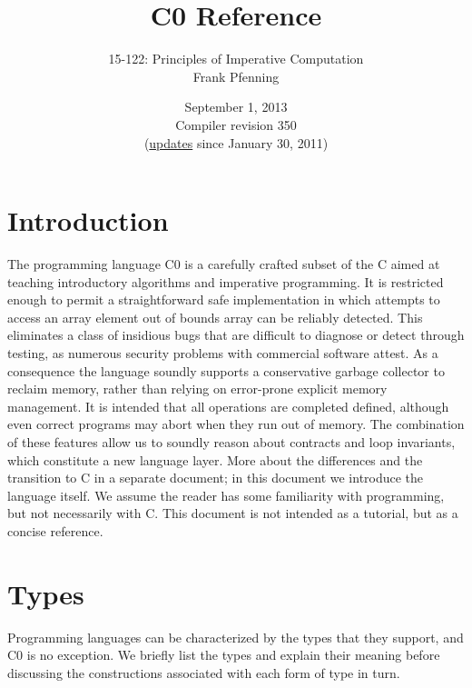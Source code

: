 \documentclass[11pt]{article}
\title{C0 Reference}
\author{15-122: Principles of Imperative Computation \\ Frank Pfenning}
\date{September 1, 2013\\Compiler revision 350\\
  (\hyperlink{sec:updates}{updates} since January 30, 2011)}
\begin{document}
\maketitle

\section{Introduction}

The programming language C0 is a carefully crafted subset of the C
aimed at teaching introductory algorithms and imperative programming.
It is restricted enough to permit a straightforward safe
implementation in which attempts to access an array element out of
bounds array can be reliably detected.  This eliminates a class of
insidious bugs that are difficult to diagnose or detect through
testing, as numerous security problems with commercial software
attest.  As a consequence the language soundly supports a conservative
garbage collector to reclaim memory, rather than relying on
error-prone explicit memory management.  It is intended that all
operations are completed defined, although even correct programs may
abort when they run out of memory.  The combination of these features
allow us to soundly reason about contracts and loop invariants, which
constitute a new language layer.  More about the differences and the
transition to C in a separate document; in this document we introduce
the language itself.  We assume the reader has some familiarity with
programming, but not necessarily with C\@.  This document is not intended
as a tutorial, but as a concise reference.

\section{Types}

Programming languages can be characterized by the types that they support,
and C0 is no exception.  We briefly list the types and explain their
meaning before discussing the constructions associated with each
form of type in turn.
\end{document}
